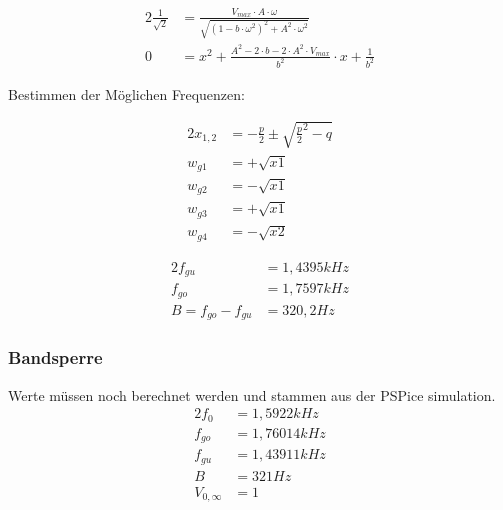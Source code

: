 \begin{alignat}{2}
\frac{1}{\sqrt{2}} &= \frac{V_{max} \cdot A \cdot \omega}{\sqrt{\left(1- b\cdot \omega^2 \right)^2 + A^2 \cdot \omega^2}}\\
0 &= x^2 + \frac{A^2 - 2 \cdot b - 2 \cdot A^2 \cdot V_{max}}{b^2} \cdot x + \frac{1}{b^2}
\end{alignat}

\noindent Bestimmen der Möglichen Frequenzen:

\begin{alignat}{2}
x_{1,2} &= -\frac{p}{2} \pm \sqrt{\frac{p}{2}^2 - q}\\
w_{g1} &= +\sqrt{x1}\\
w_{g2} &= -\sqrt{x1}\\
w_{g3} &= +\sqrt{x1}\\
w_{g4} &= -\sqrt{x2}
\end{alignat}

\begin{alignat}{2}
f_{gu} &= 1,4395 kHz\\
f_{go} &= 1,7597 kHz\\
B = f_{go} - f_{gu} &= 320,2 Hz
\end{alignat}

\subsubsection{Bandsperre}

Werte müssen noch berechnet werden und stammen aus der PSPice simulation.\\

\begin{alignat}{2}
f_{0} &= 1,5922 kHz\\
f_{go} &= 1,76014 kHz\\
f_{gu} &= 1,43911 kHz\\
B &= 321 Hz\\
V_{0,\infty} &= 1
\end{alignat}
